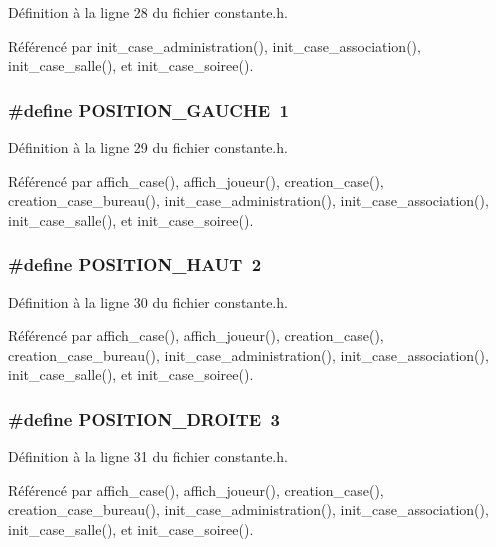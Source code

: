 D\'{e}finition \`{a} la ligne 28 du fichier constante.h.

R\'{e}f\'{e}renc\'{e} par init\_\-case\_\-administration(), init\_\-case\_\-association(), init\_\-case\_\-salle(), et init\_\-case\_\-soiree().
\subsubsection{\setlength{\rightskip}{0pt plus 5cm}\#define POSITION\_\-GAUCHE~1}\label{constante_8h_e19ebd2179fcd5027bf379be7764a962}




D\'{e}finition \`{a} la ligne 29 du fichier constante.h.

R\'{e}f\'{e}renc\'{e} par affich\_\-case(), affich\_\-joueur(), creation\_\-case(), creation\_\-case\_\-bureau(), init\_\-case\_\-administration(), init\_\-case\_\-association(), init\_\-case\_\-salle(), et init\_\-case\_\-soiree().
\subsubsection{\setlength{\rightskip}{0pt plus 5cm}\#define POSITION\_\-HAUT~2}\label{constante_8h_7cfb4f921ae70a43e7162e99b7bc7b5c}




D\'{e}finition \`{a} la ligne 30 du fichier constante.h.

R\'{e}f\'{e}renc\'{e} par affich\_\-case(), affich\_\-joueur(), creation\_\-case(), creation\_\-case\_\-bureau(), init\_\-case\_\-administration(), init\_\-case\_\-association(), init\_\-case\_\-salle(), et init\_\-case\_\-soiree().
\subsubsection{\setlength{\rightskip}{0pt plus 5cm}\#define POSITION\_\-DROITE~3}\label{constante_8h_0347c6b377338f879ee273cbd1fd839d}




D\'{e}finition \`{a} la ligne 31 du fichier constante.h.

R\'{e}f\'{e}renc\'{e} par affich\_\-case(), affich\_\-joueur(), creation\_\-case(), creation\_\-case\_\-bureau(), init\_\-case\_\-administration(), init\_\-case\_\-association(), init\_\-case\_\-salle(), et init\_\-case\_\-soiree().
